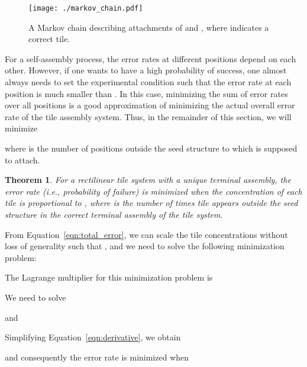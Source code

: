 \documentclass[11pt]{article}
\newtheorem{theorem}{Theorem}
\newenvironment{proof}{{\bf Proof:}}{\par}
\begin{document}
\begin{figure*}[htbp]
    \centering
    {\texttt{[image: ./markov\_chain.pdf]}}
  \caption{\label{fig:markov_chain}
    \small{A Markov chain describing attachments of  and , where  indicates a correct tile.}} 
\end{figure*}







For a self-assembly process, the error rates at different positions depend on each other. However, if one wants to have a high probability of success, one almost always needs to set the experimental condition such that the error rate at each position is much smaller than . In this case, minimizing the sum of error rates over all positions is a good approximation of minimizing the actual overall error rate of the tile assembly system. Thus, in the remainder of this section, we will minimize 

where  is the number of positions outside the seed structure to which  is supposed to attach. 

















\begin{theorem}
\label{thm:error}
For a rectilinear tile system with a unique terminal assembly, the error rate (i.e., probability of failure) is minimized when the concentration of each tile  is proportional to , where  is the number of times tile  appears outside the seed structure in the correct terminal assembly of the tile system.
\end{theorem}

\begin{proof}
From Equation~\ref{eqn:total_error}, we can scale the tile concentrations  without loss of generality such that , and we need to solve the following minimization problem:




The Lagrange multiplier for this minimization problem is


We need to solve 


and 


Simplifying Equation~\ref{eqn:derivative}, we obtain 


and consequently the error rate is minimized when

\end{proof}
\end{document}
